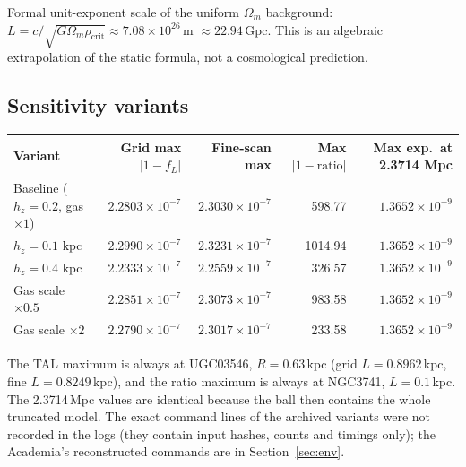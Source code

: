 \documentclass[10pt,a4paper]{article}
\begin{document}
Formal unit-exponent scale of the uniform $\Omega_m$ background: $L=c/\sqrt{G\Omega_m\rho_\mathrm{crit}}\approx7.08\times10^{26}$\,m $\approx22.94$\,Gpc. This is an algebraic extrapolation of the static formula, not a cosmological prediction.

\subsection{Sensitivity variants}
\begin{center}\footnotesize
\begin{tabular}{@{}lrrrr@{}}
\toprule
Variant & Grid max $|1-f_L|$ & Fine-scan max & Max $|1-\text{ratio}|$ & Max exp.\ at 2.3714 Mpc\\
\midrule
Baseline ($h_z=0.2$, gas $\times1$) & $2.2803\times10^{-7}$ & $2.3030\times10^{-7}$ & 598.77 & $1.3652\times10^{-9}$\\
$h_z=0.1$ kpc & $2.2990\times10^{-7}$ & $2.3231\times10^{-7}$ & 1014.94 & $1.3652\times10^{-9}$\\
$h_z=0.4$ kpc & $2.2333\times10^{-7}$ & $2.2559\times10^{-7}$ & 326.57 & $1.3652\times10^{-9}$\\
Gas scale $\times0.5$ & $2.2851\times10^{-7}$ & $2.3073\times10^{-7}$ & 983.58 & $1.3652\times10^{-9}$\\
Gas scale $\times2$ & $2.2790\times10^{-7}$ & $2.3017\times10^{-7}$ & 233.58 & $1.3652\times10^{-9}$\\
\bottomrule
\end{tabular}
\end{center}
The TAL maximum is always at UGC03546, $R=0.63$\,kpc (grid $L=0.8962$\,kpc, fine $L=0.8249$\,kpc), and the ratio maximum is always at NGC3741, $L=0.1$\,kpc. The 2.3714\,Mpc values are identical because the ball then contains the whole truncated model. The exact command lines of the archived variants were not recorded in the logs (they contain input hashes, counts and timings only); the Academia's reconstructed commands are in Section~\ref{sec:env}.
\end{document}
